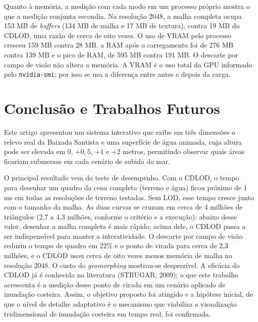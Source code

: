 \documentclass[conference]{IEEEtran}
\begin{document}
Quanto à memória, a medição com cada modo em um processo próprio mostra o que a medição conjunta escondia. Na resolução 2048, a malha completa ocupa 153 MB de \emph{buffers} (134 MB de malha e 17 MB de textura), contra 19 MB do CDLOD, uma razão de cerca de oito vezes. O uso de VRAM pelo processo cresceu 159 MB contra 28 MB, a RAM após o carregamento foi de 276 MB contra 139 MB e o pico de RAM, de 595 MB contra 191 MB. O descarte por campo de visão não altera a memória. A VRAM é o uso total da GPU informado pelo \texttt{nvidia-smi}; por isso se usa a diferença entre antes e depois da carga.

\section{Conclusão e Trabalhos Futuros}
\label{sec:conclusao}

Este artigo apresentou um sistema interativo que exibe em três dimensões o
relevo real da Baixada Santista e uma superfície de água animada, cuja
altura pode ser elevada em 0, $+0{,}5$, $+1$ e $+2$ metros, permitindo
observar quais áreas ficariam submersas em cada cenário de subida do mar.

O principal resultado vem do teste de desempenho. Com o CDLOD, o tempo para
desenhar um quadro da cena completa (terreno e água) ficou próximo de 1 ms
em todas as resoluções de terreno testadas. Sem LOD, esse tempo cresce
junto com o tamanho da malha. As duas curvas se cruzam em cerca de 4 milhões de triângulos (2,7 a 4,3 milhões, conforme o critério e a execução): abaixo desse valor, desenhar a malha completa é mais rápido; acima dele, o CDLOD passa a ser indispensável para manter a interatividade. O descarte por campo de visão reduziu o tempo de quadro em 22\% e o ponto de virada para cerca de 2,3 milhões, e o CDLOD usou cerca de oito vezes menos memória de malha na resolução 2048. O custo do \emph{geomorphing} mostrou-se desprezível. A eficácia do CDLOD já é conhecida na literatura (STRUGAR,
2009); o que este trabalho acrescenta é a medição desse ponto de virada em
um cenário aplicado de inundação costeira. Assim, o objetivo proposto foi
atingido e a hipótese inicial, de que o nível de detalhe adaptativo é o
mecanismo que viabiliza a visualização tridimensional de inundação costeira
em tempo real, foi confirmada.
\end{document}
